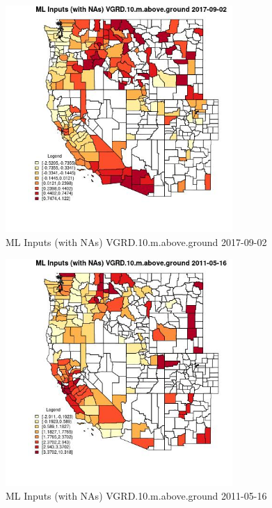 \begin{figure} 
\centering  
\includegraphics[width=0.77\textwidth]{Code_Outputs/Report_ML_input_PM25_Step4_part_e_de_duplicated_aves_compiled_2019-05-21wNAs_CountyVGRD10mabovegroundMean2017-09-02.jpg} 
\caption{\label{fig:Report_ML_input_PM25_Step4_part_e_de_duplicated_aves_compiled_2019-05-21wNAsCountyVGRD10mabovegroundMean2017-09-02}ML Inputs (with NAs) VGRD.10.m.above.ground 2017-09-02} 
\end{figure} 
 

\begin{figure} 
\centering  
\includegraphics[width=0.77\textwidth]{Code_Outputs/Report_ML_input_PM25_Step4_part_e_de_duplicated_aves_compiled_2019-05-21wNAs_CountyVGRD10mabovegroundMean2011-05-16.jpg} 
\caption{\label{fig:Report_ML_input_PM25_Step4_part_e_de_duplicated_aves_compiled_2019-05-21wNAsCountyVGRD10mabovegroundMean2011-05-16}ML Inputs (with NAs) VGRD.10.m.above.ground 2011-05-16} 
\end{figure} 
 

